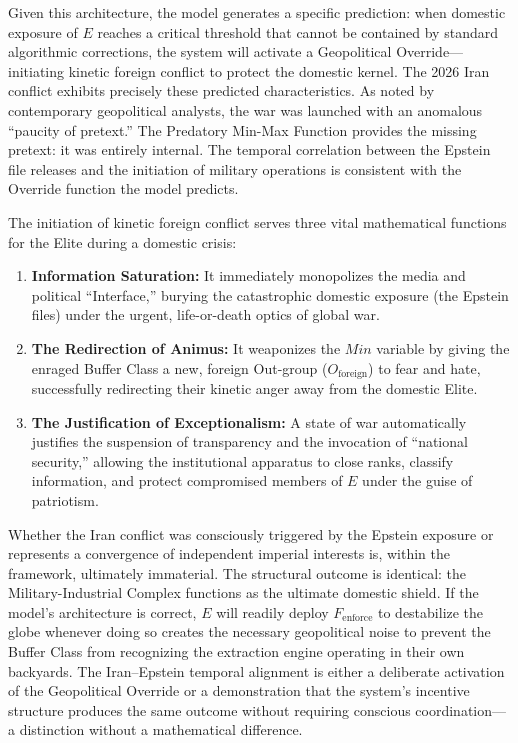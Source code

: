 \documentclass[12pt,openany]{book}
\begin{document}
Given this architecture, the model generates a specific prediction: when domestic exposure of $E$ reaches a critical threshold that cannot be contained by standard algorithmic corrections, the system will activate a Geopolitical Override---initiating kinetic foreign conflict to protect the domestic kernel. The 2026 Iran conflict exhibits precisely these predicted characteristics. As noted by contemporary geopolitical analysts, the war was launched with an anomalous ``paucity of pretext.'' The Predatory Min-Max Function provides the missing pretext: it was entirely internal. The temporal correlation between the Epstein file releases and the initiation of military operations is consistent with the Override function the model predicts.

The initiation of kinetic foreign conflict serves three vital mathematical functions for the Elite during a domestic crisis:

\begin{enumerate}
    \item \textbf{Information Saturation:} It immediately monopolizes the media and political ``Interface,'' burying the catastrophic domestic exposure (the Epstein files) under the urgent, life-or-death optics of global war.

    \item \textbf{The Redirection of Animus:} It weaponizes the $Min$ variable by giving the enraged Buffer Class a new, foreign Out-group ($O_{\text{foreign}}$) to fear and hate, successfully redirecting their kinetic anger away from the domestic Elite.

    \item \textbf{The Justification of Exceptionalism:} A state of war automatically justifies the suspension of transparency and the invocation of ``national security,'' allowing the institutional apparatus to close ranks, classify information, and protect compromised members of $E$ under the guise of patriotism.
\end{enumerate}

Whether the Iran conflict was consciously triggered by the Epstein exposure or represents a convergence of independent imperial interests is, within the framework, ultimately immaterial. The structural outcome is identical: the Military-Industrial Complex functions as the ultimate domestic shield. If the model's architecture is correct, $E$ will readily deploy $F_{\text{enforce}}$ to destabilize the globe whenever doing so creates the necessary geopolitical noise to prevent the Buffer Class from recognizing the extraction engine operating in their own backyards. The Iran--Epstein temporal alignment is either a deliberate activation of the Geopolitical Override or a demonstration that the system's incentive structure produces the same outcome without requiring conscious coordination---a distinction without a mathematical difference.
\end{document}
